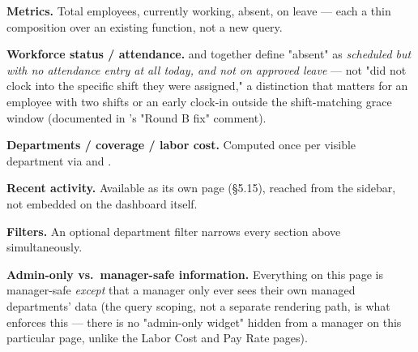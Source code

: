 \textbf{Metrics.} Total employees, currently working, absent, on leave
--- each a thin composition over an existing 
function, not a new query.

\textbf{Workforce status / attendance.} 
and  together define "absent" as
\emph{scheduled but with no attendance entry at all today, and not on
approved leave} --- not "did not clock into the specific shift they
were assigned," a distinction that matters for an employee with two
shifts or an early clock-in outside the shift-matching grace window
(documented in 's "Round B fix" comment).

\textbf{Departments / coverage / labor cost.} Computed once per visible
department via  and
.

\textbf{Recent activity.} Available as its own page (\S5.15), reached
from the sidebar, not embedded on the dashboard itself.

\textbf{Filters.} An optional department filter narrows every section
above simultaneously.

\textbf{Admin-only vs.\ manager-safe information.} Everything on this
page is manager-safe \emph{except} that a manager only ever sees their
own managed departments' data (the query scoping, not a separate
rendering path, is what enforces this --- there is no
"admin-only widget" hidden from a manager on this particular page,
unlike the Labor Cost and Pay Rate pages).
